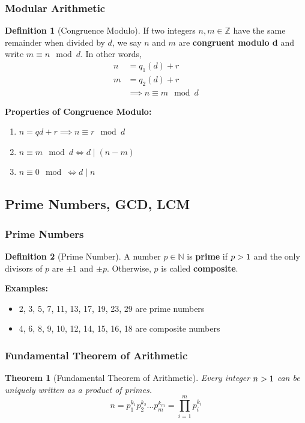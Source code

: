 \documentclass[12pt]{article}
\newcommand{\gt}{\ensuremath >}
\newcommand{\Z}{\mathbb{Z}}
\newcommand{\N}{\mathbb{N}}
\newtheorem{theorem}{Theorem}
\theoremstyle{definition}
\newtheorem{definition}{Definition}
\begin{document}
    \subsubsection{Modular Arithmetic}
    \begin{definition}[Congruence Modulo]
        \label{def:congruence-modulo}
        If two integers $n , m \in \Z$ have the same remainder when divided by $d$, we say
        $n$ and $m$ are \textbf{congruent modulo d} and write $m \equiv n \mod d$. In other words,
        \begin{align*}
            n &= q_1(d) + r \\
            m &= q_2(d) + r \\
            &\implies n \equiv m \mod d
        \end{align*}
    \end{definition}

    \textbf{Properties of Congruence Modulo:}
    \begin{enumerate}
        \item $n = qd +r \implies n \equiv r \mod d$
        \item $n \equiv m \mod d \iff d \mid (n - m)$
        \item $n \equiv 0 \mod \iff d \mid n$
    \end{enumerate}

    \subsection{Prime Numbers, GCD, LCM}
    \subsubsection{Prime Numbers}
    \begin{definition}[Prime Number]
        \label{def:prime-number}
        A number $p \in \N$  is \textbf{prime} if $p \gt 1$ and the only divisors of $p$
        are $\pm 1$ and $\pm p$. Otherwise, $p$ is called \textbf{composite}.
    \end{definition}
    \textbf{Examples:}
    \begin{itemize}
        \item 2, 3, 5, 7, 11, 13, 17, 19, 23, 29 are prime numbers
        \item 4, 6, 8, 9, 10, 12, 14, 15, 16, 18 are composite numbers
    \end{itemize}

    \subsubsection{Fundamental Theorem of Arithmetic}
    \begin{theorem}[Fundamental Theorem of Arithmetic]
        \label{thm:fundamental-theorem-of-arithmetic}
        Every integer $n \gt 1$ can be uniquely written as a product of primes.
        \begin{equation*}
            n = p_1^{k_1} p_2^{k_2} \dots p_m^{k_m} = \prod_{i=1}^{m} p_i^{k_i}
        \end{equation*}
    \end{theorem}
\end{document}
